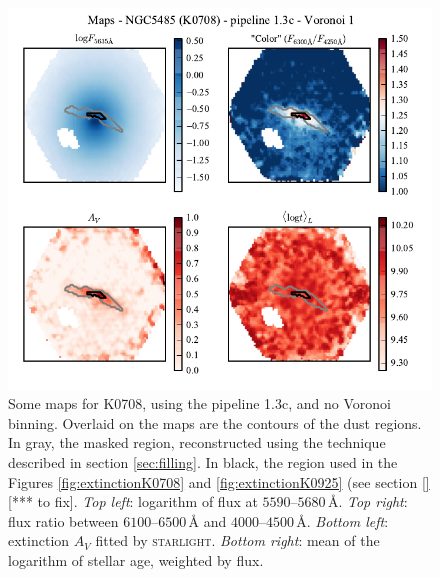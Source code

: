 \documentclass[a4paper]{article}
\newcommand{\angstrom}{\text{\AA}}
\def\starlight{\textsc{starlight}\xspace}
\begin{document}
\begin{figure}
\includegraphics{figures/maps_K0708_1.3c_v01.pdf}

\caption{Some maps for K0708, using the pipeline 1.3c, and no Voronoi binning.
Overlaid on the maps are the contours of the dust regions. In gray, the masked
region, reconstructed using the technique described in section
\ref{sec:filling}. In black, the region used in the Figures
\ref{fig:extinctionK0708} and \ref{fig:extinctionK0925} (see section
\ref{}[*** to fix].
{\em Top left}:
logarithm of flux at $5590$--$5680\,\angstrom$.
{\em Top right}: flux ratio between $6100$--$6500\,\angstrom$ and
$4000$--$4500\,\angstrom$. {\em Bottom left}: extinction $A_V$ fitted by
\starlight. {\em Bottom right}: mean of the logarithm of stellar age, weighted
by flux.}

\label{fig:mapsK0708}
\end{figure}
\end{document}
